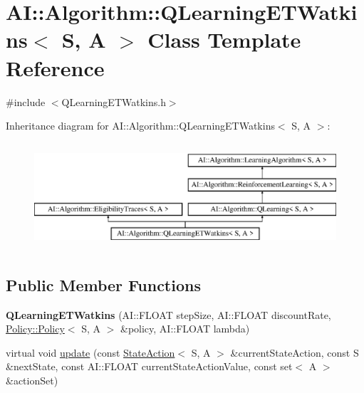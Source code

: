 \hypertarget{classAI_1_1Algorithm_1_1QLearningETWatkins}{\section{A\-I\-:\-:Algorithm\-:\-:Q\-Learning\-E\-T\-Watkins$<$ S, A $>$ Class Template Reference}
\label{classAI_1_1Algorithm_1_1QLearningETWatkins}
}


{\ttfamily \#include $<$Q\-Learning\-E\-T\-Watkins.\-h$>$}

Inheritance diagram for A\-I\-:\-:Algorithm\-:\-:Q\-Learning\-E\-T\-Watkins$<$ S, A $>$\-:\begin{figure}[H]
\begin{center}
\leavevmode
\includegraphics[height=4.000000cm]{classAI_1_1Algorithm_1_1QLearningETWatkins}
\end{center}
\end{figure}
\subsection*{Public Member Functions}
\begin{DoxyCompactItemize}
\item 
\hypertarget{classAI_1_1Algorithm_1_1QLearningETWatkins_a0304d02e8ea871414b23e6201e1f1dcc}{{\bfseries Q\-Learning\-E\-T\-Watkins} (A\-I\-::\-F\-L\-O\-A\-T step\-Size, A\-I\-::\-F\-L\-O\-A\-T discount\-Rate, \hyperlink{classAI_1_1Algorithm_1_1Policy_1_1Policy}{Policy\-::\-Policy}$<$ S, A $>$ \&policy, A\-I\-::\-F\-L\-O\-A\-T lambda)}\label{classAI_1_1Algorithm_1_1QLearningETWatkins_a0304d02e8ea871414b23e6201e1f1dcc}

\item 
virtual void \hyperlink{classAI_1_1Algorithm_1_1QLearningETWatkins_a5cbad8c16dfbf6fe72c85fe5c8c4e273}{update} (const \hyperlink{classAI_1_1StateAction}{State\-Action}$<$ S, A $>$ \&current\-State\-Action, const S \&next\-State, const A\-I\-::\-F\-L\-O\-A\-T current\-State\-Action\-Value, const set$<$ A $>$ \&action\-Set)
\end{DoxyCompactItemize}
